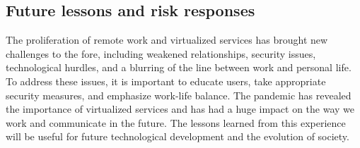 \documentclass[12pt]{article}
\begin{document}
\subsection{Future lessons and risk responses}
The proliferation of remote work and virtualized services has brought new
challenges to the fore, including weakened relationships, security issues,
technological hurdles, and a blurring of the line between work and personal
life. To address these issues, it is important to educate users, take
appropriate security measures, and emphasize work-life balance. The pandemic
has revealed the importance of virtualized services and has had a huge impact
on the way we work and communicate in the future. The lessons learned from this
experience will be useful for future technological development and the
evolution of society.
\end{document}
